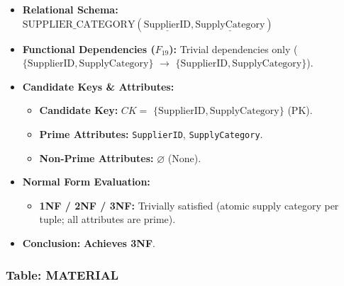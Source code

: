 \documentclass[a4paper,12pt]{report}
\providecommand{\tightlist}{%
  \setlength{\itemsep}{0pt}\setlength{\parskip}{0pt}}
\begin{document}
\begin{itemize}
\item
  \textbf{Relational Schema:} \(\text{SUPPLIER\_CATEGORY}(\underline{\text{SupplierID}}, \underline{\text{SupplyCategory}})\)
\item
  \textbf{Functional Dependencies (\(F_{19}\)):} Trivial dependencies only (\(\{\text{SupplierID}, \text{SupplyCategory}\}\) \(\rightarrow\) \(\{\text{SupplierID}, \text{SupplyCategory}\}\)).
\item
  \textbf{Candidate Keys \& Attributes:}

  \begin{itemize}
  \item
    \textbf{Candidate Key:} \(CK =\) \(\{\text{SupplierID}, \text{SupplyCategory}\}\) (PK).
  \item
    \textbf{Prime Attributes:} \texttt{SupplierID}, \texttt{SupplyCategory}.
  \item
    \textbf{Non-Prime Attributes:} \(\varnothing\) (None).
  \end{itemize}
\item
  \textbf{Normal Form Evaluation:}

  \begin{itemize}
  \tightlist
  \item
    \textbf{1NF / 2NF / 3NF:} Trivially satisfied (atomic supply category per tuple; all attributes are prime).
  \end{itemize}
\item
  \textbf{Conclusion:} \textbf{Achieves 3NF}.
\end{itemize}

\subsubsection{Table: MATERIAL}\label{table-material}
\end{document}
